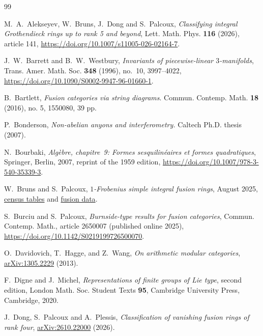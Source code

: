 \documentclass{amsart}
\begin{document}
\raggedbottom
\begin{thebibliography}{99}


{\sc M.~A.~Alekseyev, W.~Bruns, J.~Dong and S.~Palcoux},
{\em Classifying integral Grothendieck rings up to rank 5 and beyond},
Lett. Math. Phys. \textbf{116} (2026), article 141,
\url{https://doi.org/10.1007/s11005-026-02164-7}.

{\sc J.~W.~Barrett and B.~W.~Westbury},
{\em Invariants of piecewise-linear $3$-manifolds},
Trans. Amer. Math. Soc. \textbf{348} (1996), no.~10, 3997--4022,
\url{https://doi.org/10.1090/S0002-9947-96-01660-1}.

{\sc B.~Bartlett}, {\em Fusion categories via string diagrams}. Commun. Contemp. Math. \textbf{18} (2016), no. 5, 1550080, 39 pp.

{\sc P.~Bonderson}, {\em Non-abelian anyons and interferometry.} Caltech Ph.D. thesis (2007).

{\sc N.~Bourbaki}, {\em Algèbre, chapitre~9: Formes sesquilinéaires et formes quadratiques},
Springer, Berlin, 2007, reprint of the 1959 edition,
\url{https://doi.org/10.1007/978-3-540-35339-3}.

{\sc W.~Bruns and S.~Palcoux},
{\em $1$-Frobenius simple integral fusion rings}, August 2025,
\href{https://github.com/sebastienpalcoux/Fusion-Categories/blob/06f3a37b086c0591e086a3aed9a9458f4270165f/SimpleIntegralPaper/1FrobSimpleIntegral.pdf}{census tables} and \href{https://github.com/sebastienpalcoux/Fusion-Categories/blob/06f3a37b086c0591e086a3aed9a9458f4270165f/SimpleIntegralPaper/1FrobSimpleIntegralFusionData.pdf}{fusion data}.

{\sc S.~Burciu and S.~Palcoux},
{\em Burnside-type results for fusion categories},
Commun. Contemp. Math., article 2650007 (published online 2025),
\url{https://doi.org/10.1142/S0219199726500070}.

{\sc O.~Davidovich, T.~Hagge, and Z.~Wang}, {\em On arithmetic modular categories}, \href{https://arxiv.org/abs/1305.2229}{arXiv:1305.2229} (2013).

{\sc F.~Digne and J.~Michel},
{\em Representations of finite groups of Lie type}, second edition,
London Math. Soc. Student Texts \textbf{95}, Cambridge University Press, Cambridge, 2020.

{\sc J.~Dong, S.~Palcoux and A.~Plessis},
{\em Classification of vanishing fusion rings of rank four},
\href{https://arxiv.org/abs/2610.22000}{arXiv:2610.22000} (2026).


\end{thebibliography}
\end{document}
